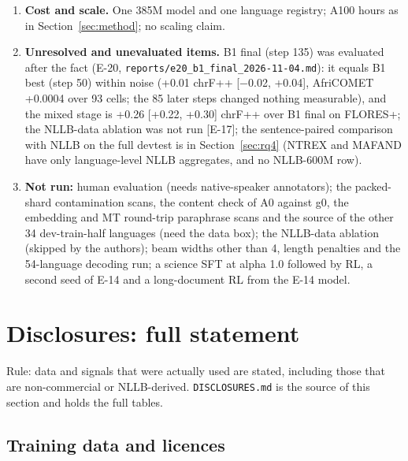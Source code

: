 \begin{enumerate}
\item \textbf{Cost and scale.} One 385M model and one language registry; A100 hours as in Section~\ref{sec:method}; no scaling claim.
\item \textbf{Unresolved and unevaluated items.} B1 final (step 135) was evaluated after the fact (E-20, \texttt{reports/\allowbreak{}e20\_\allowbreak{}b1\_\allowbreak{}final\_\allowbreak{}2026-\allowbreak{}11-\allowbreak{}04.\allowbreak{}md}): it equals B1 best (step 50) within noise (+0.01 chrF++ [\ensuremath{-}0.02, +0.04], AfriCOMET +0.0004 over 93 cells; the 85 later steps changed nothing measurable), and the mixed stage is +0.26 [+0.22, +0.30] chrF++ over B1 final on FLORES+; the NLLB-data ablation was not run [E-17]; the sentence-paired comparison with NLLB on the full devtest is in Section~\ref{sec:rq4} (NTREX and MAFAND have only language-level NLLB aggregates, and no NLLB-600M row).
\item \textbf{Not run:} human evaluation (needs native-speaker annotators); the packed-shard contamination scans, the content check of A0 against g0, the embedding and MT round-trip paraphrase scans and the source of the other 34 dev-train-half languages (need the data box); the NLLB-data ablation (skipped by the authors); beam widths other than 4, length penalties and the 54-language decoding run; a science SFT at alpha 1.0 followed by RL, a second seed of E-14 and a long-document RL from the E-14 model.
\end{enumerate}

\section{Disclosures: full statement}\label{app:disc}

Rule: data and signals that were actually used are stated, including those that are non-commercial or NLLB-derived. \texttt{DISCLOSURES.\allowbreak{}md} is the source of this section and holds the full tables. 

\subsection{Training data and licences}


